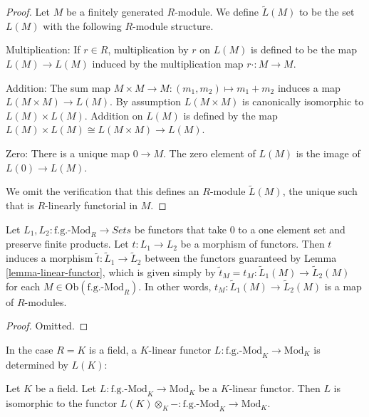 \begin{proof}
Let $M$ be a finitely generated $R$-module. We define $\widetilde{L}(M)$ to be 
the set $L(M)$ with the following $R$-module structure.

\medskip \noindent
Multiplication: If $r \in R$, multiplication by $r$ on $L(M)$ is defined to be 
the map $L(M) \to L(M)$ induced by the multiplication map $r \cdot: M 
\to M$.

\medskip \noindent
Addition: The sum map $M \times M \to M: (m_1,m_2) \mapsto m_1 + m_2$ 
induces a map $L(M \times M) \to L(M)$. By assumption $L(M \times M)$ 
is canonically isomorphic to $L(M) \times L(M)$.  Addition on $L(M)$ is defined 
by the map $L(M) \times L(M) \cong L(M \times M) \to L(M)$.

\medskip \noindent
Zero: There is a unique map $0 \to M$.  The zero element of $L(M)$ is 
the image of $L(0) \to L(M)$.

\medskip \noindent
We omit the verification that this defines an $R$-module $\widetilde{L}(M)$, 
the unique such that is $R$-linearly functorial in $M$.
\end{proof}

\begin{lemma}
\label{lemma-morphism-linear-functors}
Let $L_1,L_2: \text{f.g.-Mod}_R \to \textit{Sets}$ be 
functors that take $0$ to a one element set and preserve finite products.  Let 
$t: L_1 \to L_2$ be a morphism of functors. Then $t$ induces a morphism 
$\widetilde{t}: \widetilde{L}_1 \to \widetilde{L}_2$ between the 
functors guaranteed by Lemma \ref{lemma-linear-functor}, which is given simply 
by $\widetilde{t}_M = t_M: \widetilde{L}_1(M) \to \widetilde{L}_2(M)$ 
for each $M \in \text{Ob}(\text{f.g.-Mod}_{R})$. In other words, 
$t_M: \widetilde{L}_1(M) \to \widetilde{L}_2(M)$ is a map of 
$R$-modules.
\end{lemma}

\begin{proof}
Omitted.
\end{proof}

\noindent
In the case $R = K$ is a field, a $K$-linear functor $L: 
\text{f.g.-Mod}_{K} \to \text{Mod}_{K}$ is determined by 
$L(K)$:

\begin{lemma}
\label{lemma-linear-functor-over-field}
Let $K$ be a field. Let $L: \text{f.g.-Mod}_{K} \to 
\text{Mod}_{K}$ be a $K$-linear functor.  Then $L$ is isomorphic to the 
functor $L(K) \otimes_{K} - : \text{f.g.-Mod}_{K} \to 
\text{Mod}_{K}$.
\end{lemma}

